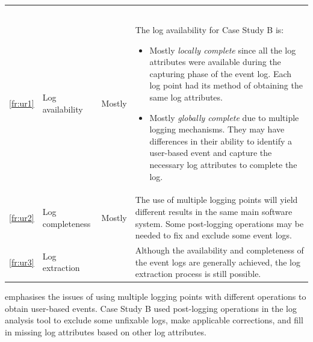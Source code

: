 \begin{xltabular}{\textwidth}{clcX}
	\caption[Logging quality assessment of Case Study B]{\textit{Logging quality assessment of Case Study B}}\label{tbl:ch3_caseBQuality}\\
	\toprule
	 &  &  &  \\
	\midrule
	\endfirsthead

	\caption[]{\continueCaption} \\
	\toprule
	 &  &  &  \\
	\midrule
	\endhead

	\midrule
	 \\
	\endfoot
	\endlastfoot

	\ref{fr:ur1} & Log availability & Mostly & \RaggedRight The log availability for Case Study B is:
		\begin{itemize}
			\item Mostly \textit{locally complete} since all the log attributes were available during the capturing phase of the event log. Each log point had its method of obtaining the same log attributes.
			\item Mostly \textit{globally complete} due to multiple logging mechanisms. They may have differences in their ability to identify a user-based event and capture the necessary log attributes to complete the log. 
		\end{itemize} \\
	\ref{fr:ur2} & Log completeness & Mostly & The use of multiple logging points will yield different results in the same main software system. Some post-logging operations may be needed to fix and exclude some event logs. \\
	\ref{fr:ur3} & Log extraction & \cmark & Although the availability and completeness of the event logs are generally achieved, the log extraction process is still possible.   \\
	\bottomrule
\end{xltabular}

 emphasises the issues of using multiple logging points with different operations to obtain user-based events. Case Study B used post-logging operations in the log analysis tool to exclude some unfixable logs, make applicable corrections, and fill in missing log attributes based on other log attributes.

